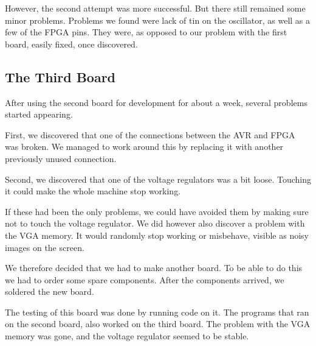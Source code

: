However, the second attempt was more successful. But there still remained some
minor problems. Problems we found were lack of tin on the oscillator, as well as
a few of the \ac{FPGA} pins. They were, as opposed to our problem with the first
board, easily fixed, once discovered.

\subsection{The Third Board}
After using the second board for development for about a week, several problems started appearing.

First, we discovered that one of the connections between the AVR and FPGA was broken. We managed to work around this by replacing it with another previously unused connection.

Second, we discovered that one of the voltage regulators was a bit loose. Touching it could make the whole machine stop working.

If these had been the only problems, we could have avoided them by making sure not to touch the voltage regulator. We did however also discover a problem with the VGA memory. It would randomly stop working or misbehave, visible as noisy images on the screen.

We therefore decided that we had to make another board. To be able to do this we had to order some spare components. After the components arrived, we soldered the new board.

The testing of this board was done by running code on it. The programs that ran on the second board, also worked on the third board. The problem with the VGA memory was gone, and the voltage regulator seemed to be stable.
